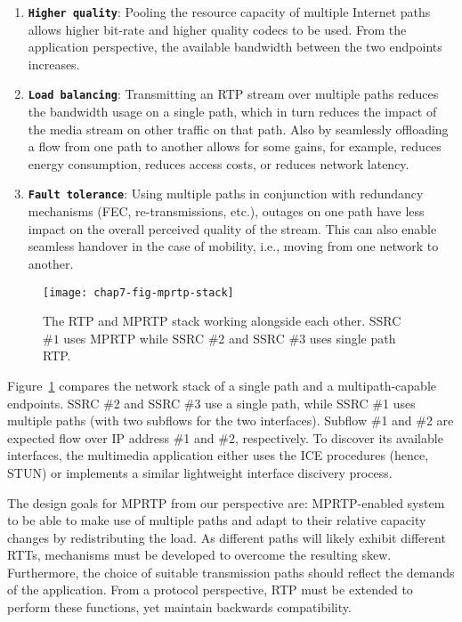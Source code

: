 \begin{enumerate}
\setlength{\itemsep}{5pt}

\item \textbf{\texttt{Higher quality}}: Pooling the resource capacity of
multiple Internet paths allows higher bit-rate and higher quality codecs to be
used. From the application perspective, the available bandwidth between the
two endpoints increases.

\item \textbf{\texttt{Load balancing}}: Transmitting an RTP stream over
multiple paths reduces the bandwidth usage on a single path, which in turn
reduces the impact of the media stream on other traffic on that path. Also by
seamlessly offloading a flow from one path to another allows for some gains,
for example, reduces energy consumption, reduces access costs, or reduces
network latency.

\item \textbf{\texttt{Fault tolerance}}: Using multiple paths in conjunction
with redundancy mechanisms (FEC, re-transmissions, etc.), outages on one path
have less impact on the overall perceived quality of the stream. This can also
enable seamless handover in the case of mobility, i.e., moving from one
network to another.

\end{enumerate}


\begin{figure}
\centerline {
\texttt{[image: chap7-fig-mprtp-stack]}
}
\caption{The RTP and MPRTP stack working alongside each other. SSRC $\#1$ uses
MPRTP while SSRC $\#2$ and SSRC $\#3$ uses single path RTP.}
\label{chap7:fig_mprtp_arch}
\end{figure}

Figure~\ref{chap7:fig_mprtp_arch} compares the network stack of a single path
and a multipath-capable endpoints. SSRC \#2 and SSRC \#3 use a single path,
while SSRC \#1 uses multiple paths (with two subflows for the two interfaces).
Subflow \#1 and \#2 are expected flow over IP address \#1 and \#2,
respectively. To discover its available interfaces, the multimedia application
either uses the ICE procedures (hence, STUN) or implements a similar
lightweight interface discivery process.

The design goals for MPRTP from our perspective are: MPRTP-enabled system to
be able to make use of multiple paths and adapt to their relative capacity
changes by redistributing the load. As different paths will likely exhibit
different RTTs, mechanisms must be developed to overcome the resulting skew.
Furthermore, the choice of suitable transmission paths should reflect the
demands of the application. From a protocol perspective, RTP must be extended
to perform these functions, yet maintain backwards compatibility.


